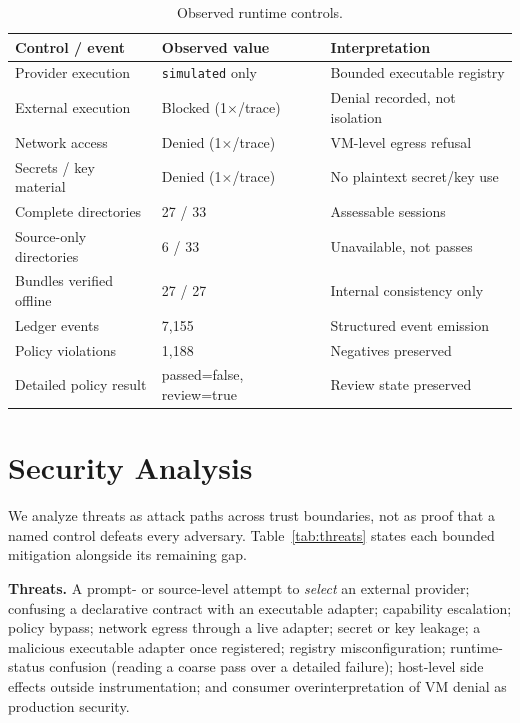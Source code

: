 \documentclass[conference]{IEEEtran}
\newcommand{\code}[1]{\texttt{\small #1}}
\begin{document}
\begin{table}[t]
\centering
\caption{Observed runtime controls.}
\label{tab:controls}
\renewcommand{\arraystretch}{1.25}
\scriptsize
\setlength{\tabcolsep}{3pt}
\begin{tabular}{@{}L{0.30\columnwidth}L{0.26\columnwidth}L{0.30\columnwidth}@{}}
\toprule
\textbf{Control / event} & \textbf{Observed value} & \textbf{Interpretation} \\
\midrule
Provider execution & \code{simulated} only & Bounded executable registry \\
External execution & Blocked (1$\times$/trace) & Denial recorded, not isolation \\
Network access & Denied (1$\times$/trace) & VM-level egress refusal \\
Secrets / key material & Denied (1$\times$/trace) & No plaintext secret/key use \\
Complete directories & 27 / 33 & Assessable sessions \\
Source-only directories & 6 / 33 & Unavailable, not passes \\
Bundles verified offline & 27 / 27 & Internal consistency only \\
Ledger events & 7{,}155 & Structured event emission \\
Policy violations & 1{,}188 & Negatives preserved \\
Detailed policy result & passed=false, review=true & Review state preserved \\
\bottomrule
\end{tabular}
\end{table}

\section{Security Analysis}\label{sec:security}
We analyze threats as attack paths across trust boundaries, not as proof that a named
control defeats every adversary. Table~\ref{tab:threats} states each bounded mitigation
alongside its remaining gap.

\noindent\textbf{Threats.} A prompt- or source-level attempt to \emph{select} an external
provider; confusing a declarative contract with an executable adapter; capability
escalation; policy bypass; network egress through a live adapter; secret or key leakage; a
malicious executable adapter once registered; registry misconfiguration; runtime-status
confusion (reading a coarse pass over a detailed failure); host-level side effects outside
instrumentation; and consumer overinterpretation of VM denial as production security.
\end{document}
